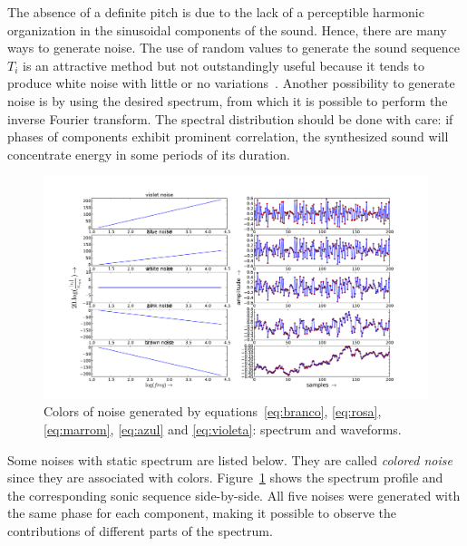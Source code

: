 The absence of a definite pitch is due to the lack of a perceptible harmonic organization in the sinusoidal components of the sound.
Hence, there are many ways to generate noise. The use of random values to generate the sound sequence $T_i$ is an attractive method but not outstandingly useful because it tends to produce white noise with little or no variations~\cite{Cook}. Another possibility to generate noise is by using the desired spectrum, from which it is possible to perform the inverse Fourier transform. The spectral distribution should be done with care: if phases of components exhibit prominent correlation, the synthesized sound will concentrate energy in some periods of its duration.

\begin{figure}
	\hspace*{-.75cm}
         \includegraphics[width=1.1\textwidth]{figures/ruidos}
     \caption{Colors of noise generated by equations~\ref{eq:branco}, \ref{eq:rosa}, \ref{eq:marrom}, \ref{eq:azul} and \ref{eq:violeta}: spectrum and waveforms.}
         \label{fig:ruidos}
\end{figure}

Some noises with static spectrum are listed below. They are called \emph{colored noise} since they are associated with colors.
Figure~\ref{fig:ruidos} shows the spectrum profile and the corresponding sonic sequence side-by-side. All five noises were generated with the same phase for each component, making it possible to observe the contributions of different parts of the spectrum.

